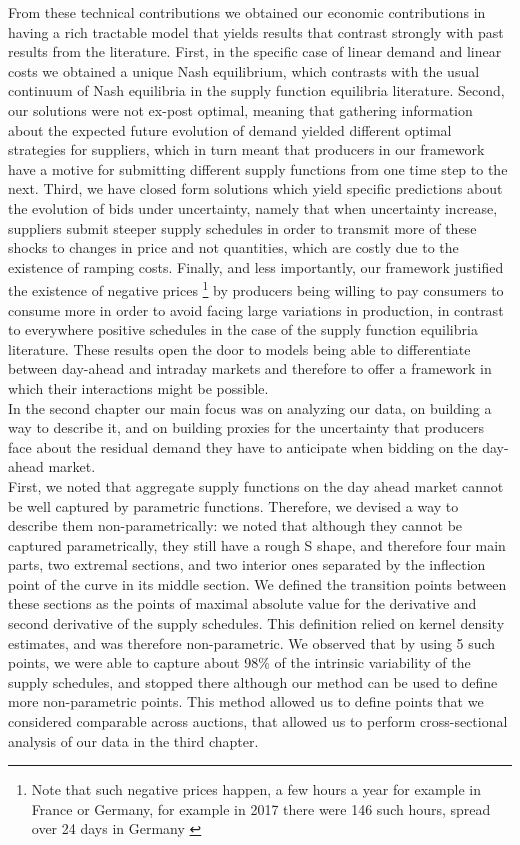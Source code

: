 From these technical contributions we obtained our economic contributions in having a rich tractable model that yields results that contrast strongly with past results from the literature. First, in the specific case of linear demand and linear costs we obtained a unique Nash equilibrium, which contrasts with the usual continuum of Nash equilibria in the supply function equilibria literature. Second, our solutions were not ex-post optimal, meaning that gathering information about the expected future evolution of demand yielded different optimal strategies for suppliers, which in turn meant that producers in our framework have a motive for submitting different supply functions from one time step to the next. Third, we have closed form solutions which yield specific predictions about the evolution of bids under uncertainty, namely that when uncertainty increase, suppliers submit steeper supply schedules in order to transmit more of these shocks to changes in price and not quantities, which are costly due to the existence of ramping costs. Finally, and less importantly, our framework justified the existence of negative prices \footnote{Note that such negative prices happen, a few hours a year for example in France or Germany, for example in 2017 there were 146 such hours, spread over 24 days in Germany \cite{epexnegP}} by producers being willing to pay consumers to consume more in order to avoid facing large variations in production, in contrast to everywhere positive schedules in the case of the supply function equilibria literature. These results open the door to models being able to differentiate between day-ahead and intraday markets and therefore to offer a framework in which their interactions might be possible.\\

In the second chapter our main focus was on analyzing our data, on building a way to describe it, and on building proxies for the uncertainty that producers face about the residual demand they have to anticipate when bidding on the day-ahead market. \\

First, we noted that aggregate supply functions on the day ahead market cannot be well captured by parametric functions. Therefore, we devised a way to describe them non-parametrically: we noted that although they cannot be captured parametrically, they still have a rough S shape, and therefore four main parts, two extremal sections, and two interior ones separated by the inflection point of the curve in its middle section. We defined the transition points between these sections as the points of maximal absolute value for the derivative and second derivative of the supply schedules. This definition relied on kernel density estimates, and was therefore non-parametric. We observed that by using 5 such points, we were able to capture about 98\% of the intrinsic variability of the supply schedules, and stopped there although our method can be used to define more non-parametric points. This method allowed us to define points that we considered comparable across auctions, that allowed us to perform cross-sectional analysis of our data in the third chapter. \\

